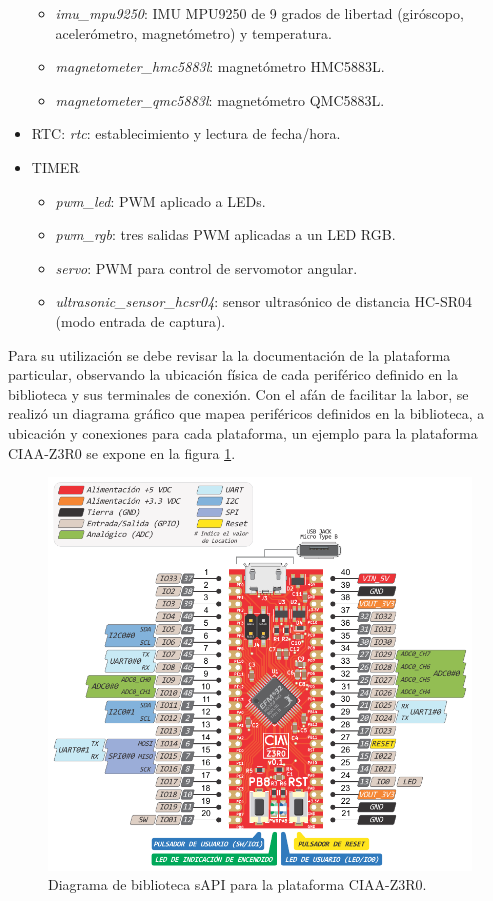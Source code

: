 \begin{itemize}
\begin{itemize}
\item \emph{imu\_mpu9250}: IMU MPU9250 de 9 grados de libertad (giróscopo, acelerómetro, magnetómetro) y temperatura.
\item \emph{magnetometer\_hmc5883l}: magnetómetro HMC5883L. 
\item \emph{magnetometer\_qmc5883l}: magnetómetro QMC5883L.
\end{itemize}
\item
RTC: \emph{rtc}: establecimiento y lectura de fecha/hora.
\item
TIMER
\begin{itemize}
\item \emph{pwm\_led}: PWM aplicado a LEDs.
\item \emph{pwm\_rgb}: tres salidas PWM aplicadas a un LED RGB.
\item \emph{servo}: PWM para control de servomotor angular.
\item \emph{ultrasonic\_sensor\_hcsr04}: sensor ultrasónico de distancia HC-SR04 (modo entrada de captura).
\end{itemize}
\end{itemize}

Para su utilización se debe revisar la la documentación de la plataforma particular, observando la ubicación física de cada periférico definido en la biblioteca y sus terminales de conexión. Con el afán de facilitar la labor, se realizó un diagrama gráfico que mapea periféricos definidos en la biblioteca, a ubicación y conexiones para cada plataforma, un ejemplo para la plataforma CIAA-Z3R0 se expone en la figura \ref{fig:mapaSapiBoard}.

\begin{figure}[!htbp]
\begin{center}  %
\includegraphics*[width=14cm]{Figures/mapaSapiBoard.pdf}
\par\caption{Diagrama de biblioteca sAPI para la plataforma CIAA-Z3R0.}\label{fig:mapaSapiBoard}
\end{center}
\end{figure}

